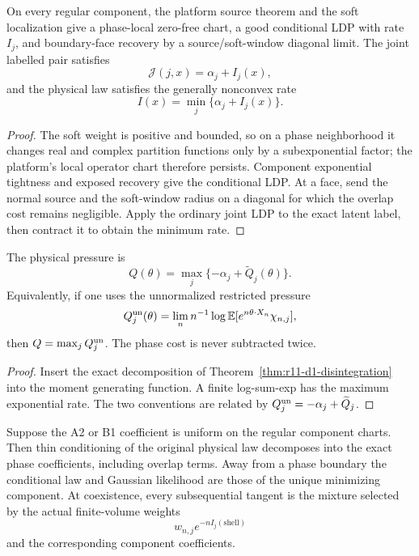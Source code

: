 \begin{theorem}
\label{thm:r11-d1-components}
On every regular component, the platform source theorem and the soft
localization give a phase-local zero-free chart, a good conditional LDP with
rate $I_j$, and boundary-face recovery by a source/soft-window diagonal
limit.  The joint labelled pair satisfies
\[
 \mathcal J(j,x)=\alpha_j+I_j(x),
\]
and the physical law satisfies the generally nonconvex rate
\[
 I(x)=\min_j\{\alpha_j+I_j(x)\}.
\]
\end{theorem}

\begin{proof}
The soft weight is positive and bounded, so on a phase neighborhood it changes
real and complex partition functions only by a subexponential factor; the
platform's local operator chart therefore persists.  Component exponential
tightness and exposed recovery give the conditional LDP.  At a face, send the
normal source and the soft-window radius on a diagonal for which the overlap
cost remains negligible.  Apply the ordinary joint LDP to the exact latent
label, then contract it to obtain the minimum rate.
\end{proof}

\begin{theorem}
\label{thm:r11-d1-pressure}
The physical pressure is
\[
 Q(\theta)=\max_j\{-\alpha_j+\widetilde Q_j(\theta)\}.
\]
Equivalently, if one uses the unnormalized restricted pressure
\[
 Q_j^{\rm un}(\theta)=\lim_n n^{-1}\log
 \mathbb E[e^{n\theta\cdot X_n}\chi_{n,j}],
\]
then $Q=\max_jQ_j^{\rm un}$.  The phase cost is never subtracted twice.
\end{theorem}

\begin{proof}
Insert the exact decomposition of
Theorem~\ref{thm:r11-d1-disintegration} into the moment generating function.
A finite log-sum-exp has the maximum exponential rate.  The two conventions
are related by $Q_j^{\rm un}=-\alpha_j+\widetilde Q_j$.
\end{proof}

\begin{theorem}
\label{thm:r11-d1-shell}
Suppose the A2 or B1 coefficient is uniform on the regular component charts.
Then thin conditioning of the original physical law decomposes into the exact
phase coefficients, including overlap terms.  Away from a phase boundary the
conditional law and Gaussian likelihood are those of the unique minimizing
component.  At coexistence, every subsequential tangent is the mixture selected
by the actual finite-volume weights
\[
 w_{n,j}e^{-nI_j(\text{shell})}
\]
and the corresponding component coefficients.
\end{theorem}

